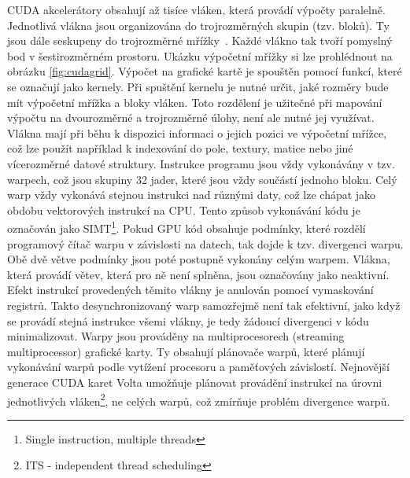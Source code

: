 CUDA akcelerátory obsahují až tisíce vláken, která provádí výpočty paralelně. Jednotlivá vlákna jsou organizována do trojrozměrných skupin (tzv. bloků). Ty jsou dále seskupeny do trojrozměrné mřížky~\cite{cudacguide}. Každé vlákno tak tvoří pomyslný bod v šestirozměrném prostoru. Ukázku výpočetní mřížky si lze prohlédnout na obrázku \ref{fig:cudagrid}. Výpočet na grafické kartě je spouštěn pomocí funkcí, které se označují jako kernely. Při spuštění kernelu je nutné určit, jaké rozměry bude mít výpočetní mřížka a bloky vláken. Toto rozdělení je užitečné při mapování výpočtu na dvourozměrné a trojrozměrné úlohy, není ale nutné jej využívat. Vlákna mají při běhu k dispozici informaci o jejich pozici ve výpočetní mřížce, což lze použít například k indexování do pole, textury, matice nebo jiné vícerozměrné datové struktury. Instrukce programu jsou vždy vykonávány v tzv. warpech, což jsou skupiny 32 jader, které jsou vždy součástí jednoho bloku. Celý warp vždy vykonává stejnou instrukci nad různými daty, což lze chápat jako obdobu vektorových instrukcí na CPU. Tento způsob vykonávání kódu je označován jako SIMT\footnote{Single instruction, multiple threads}. Pokud GPU kód obsahuje podmínky, které rozdělí programový čítač warpu v závislosti na datech, tak dojde k tzv. divergenci warpu. Obě dvě větve podmínky jsou poté postupně vykonány celým warpem. Vlákna, která provádí větev, která pro ně není splněna, jsou označovány jako neaktivní. Efekt instrukcí provedených těmito vlákny je anulován pomocí vymaskování registrů. Takto desynchronizovaný warp samozřejmě není tak efektivní, jako když se provádí stejná instrukce všemi vlákny, je tedy žádoucí divergenci v kódu minimalizovat. Warpy jsou prováděny na multiprocesorech (streaming multiprocessor) grafické karty. Ty obsahují plánovače warpů, které plánují vykonávání warpů podle vytížení procesoru a paměťových závislostí. Nejnovější generace CUDA karet Volta umožňuje plánovat provádění instrukcí na úrovni jednotlivých vláken\footnote{ITS - independent thread scheduling}, ne celých warpů, což zmírňuje problém divergence warpů.


